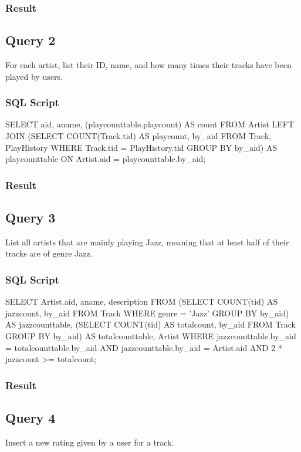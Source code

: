 \documentclass[letter, 12pt]{report}
\begin{document}
	\subsubsection{Result}
	
	\subsection{Query 2}
	For each artist, list their ID, name, and how many times their tracks have been played by users.
	\subsubsection{SQL Script}
	\begin{spverbatim}
		SELECT aid, aname, (playcounttable.playcount) AS count 
		FROM Artist LEFT JOIN
		(SELECT COUNT(Track.tid) AS playcount, by_aid 
		FROM Track, PlayHistory
		WHERE Track.tid = PlayHistory.tid
		GROUP BY by_aid) AS playcounttable
		ON Artist.aid = playcounttable.by_aid;
	\end{spverbatim}
	\subsubsection{Result}
	
	\subsection{Query 3}
	List all artists that are mainly playing Jazz, meaning that at least half of their tracks are of genre Jazz.
	\subsubsection{SQL Script}
	\begin{spverbatim}
		SELECT Artist.aid, aname, description FROM
		(SELECT COUNT(tid) AS jazzcount, by_aid
		FROM Track
		WHERE genre = 'Jazz'
		GROUP BY by_aid) AS jazzcounttable,
		(SELECT COUNT(tid) AS totalcount, by_aid
		FROM Track
		GROUP BY by_aid) AS totalcounttable, Artist
		WHERE jazzcounttable.by_aid = totalcounttable.by_aid
		AND jazzcounttable.by_aid = Artist.aid
		AND 2 * jazzcount >= totalcount;
	\end{spverbatim}
	\subsubsection{Result}
	
	\subsection{Query 4}
	Insert a new rating given by a user for a track.
\end{document}
